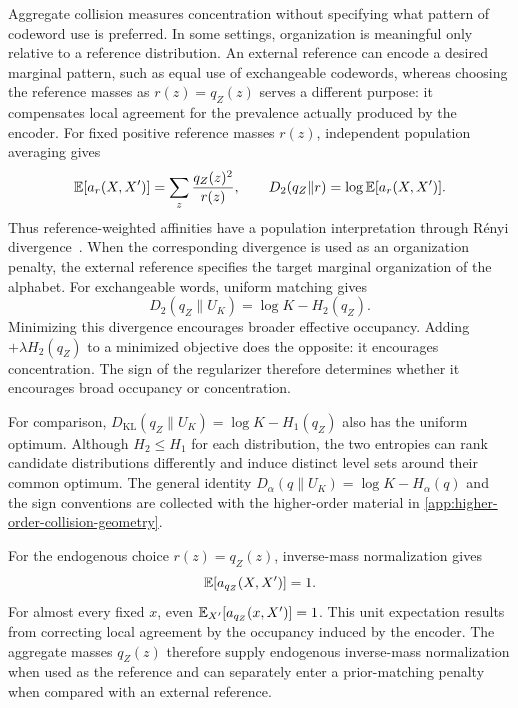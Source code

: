 Aggregate collision measures concentration without specifying what pattern of codeword use is preferred.
In some settings, organization is meaningful only relative to a reference distribution.
An external reference can encode a desired marginal pattern, such as equal use of exchangeable codewords, whereas choosing the reference masses as $r(z)=q_Z(z)$ serves a different purpose: it compensates local agreement for the prevalence actually produced by the encoder.
For fixed positive reference masses $r(z)$, independent population averaging gives
\begin{equation}
\mathbb{E}[a_r(X,X')]=\sum_z\frac{q_Z(z)^2}{r(z)},
\qquad
D_2(q_Z\|r)=\log\mathbb{E}[a_r(X,X')].
\label{eq:renyi-reference-affinity}
\end{equation}
Thus reference-weighted affinities have a population interpretation through R\'enyi divergence~\citep{renyi1961measures,vanerven2014renyi}.
When the corresponding divergence is used as an organization penalty, the external reference specifies the target marginal organization of the alphabet.
For exchangeable words, uniform matching gives
\begin{equation}
D_2(q_Z\|U_K)=\log K-H_2(q_Z).
\label{eq:uniform-renyi}
\end{equation}
Minimizing this divergence encourages broader effective occupancy.
Adding $+\lambda H_2(q_Z)$ to a minimized objective does the opposite: it encourages concentration.
The sign of the regularizer therefore determines whether it encourages broad occupancy or concentration.

For comparison, $D_{\mathrm{KL}}(q_Z\|U_K)=\log K-H_1(q_Z)$ also has the uniform optimum.
Although $H_2\le H_1$ for each distribution, the two entropies can rank candidate distributions differently and induce distinct level sets around their common optimum.
The general identity $D_\alpha(q\|U_K)=\log K-H_\alpha(q)$ and the sign conventions are collected with the higher-order material in \ref{app:higher-order-collision-geometry}.

For the endogenous choice $r(z)=q_Z(z)$, inverse-mass normalization gives
\begin{equation}
\mathbb{E}[a_{q_Z}(X,X')]=1.
\label{eq:endogenous-reference-expectation}
\end{equation}
For almost every fixed $x$, even $\mathbb{E}_{X'}[a_{q_Z}(x,X')]=1$.
This unit expectation results from correcting local agreement by the occupancy induced by the encoder.
The aggregate masses $q_Z(z)$ therefore supply endogenous inverse-mass normalization when used as the reference and can separately enter a prior-matching penalty when compared with an external reference.

